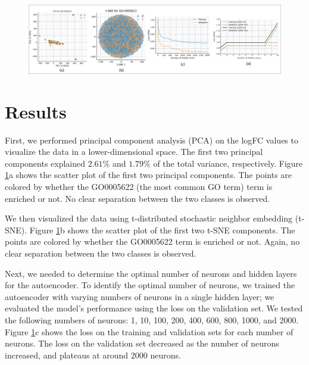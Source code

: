 
\begin{figure}[ht]
    \centering
    \includegraphics[width=\textwidth]{./images/results.png}
    \label{fig:results}
\end{figure}

\section{Results}

First, we performed principal component analysis (PCA) on the logFC values to visualize
the data in a lower-dimensional space. The first two principal components explained
$2.61\%$ and $1.79\%$ of the total variance, respectively. Figure \ref{fig:results}a shows
the scatter plot of the first two principal components. The points are colored by whether
the GO0005622 (the most common GO term) term is enriched or not. No clear separation
between the two classes is observed.

We then visualized the data using t-distributed stochastic neighbor embedding (t-SNE).
Figure \ref{fig:results}b shows the scatter plot of the first two t-SNE components. The
points are colored by whether the GO0005622 term is enriched or not. Again, no clear
separation between the two classes is observed.

Next, we needed to determine the optimal number of neurons and hidden layers for the
autoencoder. To identify the optimal number of neurons, we trained the autoencoder with
varying numbers of neurons in a single hidden layer; we evaluated the model's performance
using the loss on the validation set. We tested the following numbers of neurons: 1, 10,
100, 200, 400, 600, 800, 1000, and 2000. Figure \ref{fig:results}c shows the loss on the
training and validation sets for each number of neurons. The loss on the validation set
decreased as the number of neurons increased, and plateaus at around 2000 neurons.

